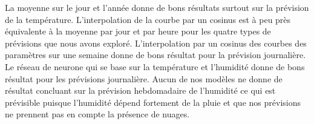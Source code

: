 \documentclass[11pt,a4paper]{article}
\begin{document}
La moyenne sur le jour et l'année donne de bons résultats surtout sur la prévision de la température. 
L'interpolation de la courbe par un cosinus est à peu près équivalente à la moyenne par jour et par heure pour les quatre types de prévisions que nous avons exploré.
L'interpolation par un cosinus des courbes des paramètres sur une semaine donne de bons résultat pour la prévision journalière.
Le réseau de neurone qui se base sur la température et l'humidité donne de bons résultat pour les prévisions journalière.
Aucun de nos modèles ne donne de résultat concluant sur la prévision hebdomadaire de l'humidité ce qui est prévisible puisque l'humidité dépend fortement de la pluie et que nos prévisions ne prennent pas en compte la présence de nuages.























\end{document}

